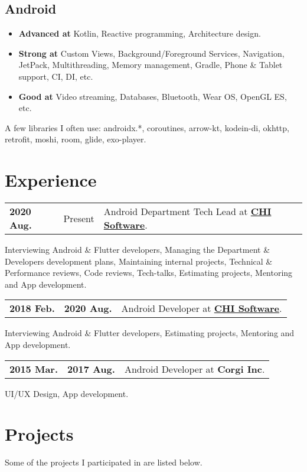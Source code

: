 \documentclass[a4paper]{article}
\begin{document}
	\subsection*{Android}
	\begin{multicols}{2}
	\begin{itemize}
		\item \textbf{Advanced at} Kotlin, Reactive programming, Architecture design.
		\item \textbf{Strong at} Custom Views, Background/Foreground Services, Navigation, JetPack, Multithreading, Memory management, Gradle, Phone \& Tablet support, CI, DI, etc.
		\item \textbf{Good at} Video streaming, Databases, Bluetooth, Wear OS, OpenGL ES, etc.
	\end{itemize}
	\end{multicols}
	
	{ \footnotesize
	A few libraries I often use: androidx.*, coroutines, arrow-kt, kodein-di, okhttp, retrofit, moshi, room, glide, exo-player.       
	}
	
	\section*{Experience}
	\begin{tabular}{@{}l@{\enspace--\enspace}ll}
		\textbf{2020 Aug.} & Present & Android Department Tech Lead at \href{https://chisw.com}{\textbf{CHI Software}}. \\
	\end{tabular}
	Interviewing Android \& Flutter developers, Managing the Department \& Developers development plans, Maintaining internal projects, Technical \& Performance reviews, Code reviews, Tech-talks, Estimating projects, Mentoring and App development.    
	\begin{tabular}{@{}l@{\enspace--\enspace}ll}
		\textbf{2018 Feb.} & \textbf{2020 Aug.} & Android Developer at \href{https://chisw.com}{\textbf{CHI Software}}. \\
	\end{tabular}
	Interviewing Android \& Flutter developers, Estimating projects, Mentoring and App development.    
	\begin{tabular}{@{}l@{\enspace--\enspace}ll}
		\textbf{2015 Mar.} & \textbf{2017 Aug.} & Android Developer at \textbf{Corgi Inc}. \\
	\end{tabular}
	UI/UX Design, App development. 

	\section*{Projects}
	Some of the projects I participated in are listed below. 
\end{document}
